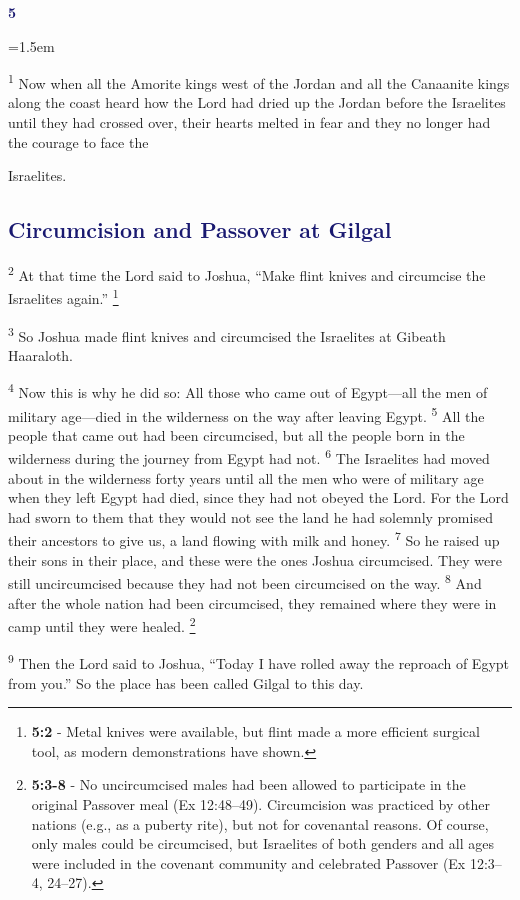 \documentclass[12pt,twoside]{article}
\newcommand{\vs}[1]{\textsuperscript{#1}}
\newcommand{\vnote}[2]{%
  \begingroup
  \renewcommand\thefootnote{}%
  \footnote{\scriptsize \textbf{}#2}%
  \addtocounter{footnote}{-1}%
  \endgroup
}
\newcommand{\chapterWithIndent}[2]{%
  \noindent
  \begin{minipage}[t]{1cm}
    \vspace{-0.4\baselineskip}
    {\textcolor{MidnightBlue}{\fontsize{40pt}{48pt}\selectfont \textbf{#1}}}
  \end{minipage}%
  \hspace{0.3cm}%
  \begin{minipage}[t]{\dimexpr\linewidth - 1.5cm - 0.3cm\relax}
    \hangindent=1.5em
    \hangafter=3
    #2
    \vspace{0.05cm}
  \end{minipage}
}
\begin{document}
\chapterWithIndent{5}{
  \vs{1} Now when all the Amorite kings west of the Jordan and all the Canaanite kings along the coast heard how the Lord had dried up the Jordan before the Israelites until they had crossed over, their hearts melted in fear and they no longer had the courage to face the
}

\noindent Israelites.

\subsection*{\textcolor{MidnightBlue}{\textbf{Circumcision and Passover at Gilgal}}}

\vs{2} At that time the Lord said to Joshua, ``Make flint knives and circumcise the Israelites again.''\vnote{5}{\textbf{5:2} - Metal knives were available, but flint made a more efficient surgical tool, as modern demonstrations have shown.}
\vs{3} So Joshua made flint knives and circumcised the Israelites at Gibeath Haaraloth.

\vs{4} Now this is why he did so: All those who came out of Egypt---all the men of military age---died in the wilderness on the way after leaving Egypt.
\vs{5} All the people that came out had been circumcised, but all the people born in the wilderness during the journey from Egypt had not.
\vs{6} The Israelites had moved about in the wilderness forty years until all the men who were of military age when they left Egypt had died, since they had not obeyed the Lord. For the Lord had sworn to them that they would not see the land he had solemnly promised their ancestors to give us, a land flowing with milk and honey.
\vs{7} So he raised up their sons in their place, and these were the ones Joshua circumcised. They were still uncircumcised because they had not been circumcised on the way.
\vs{8} And after the whole nation had been circumcised, they remained where they were in camp until they were healed.\vnote{8}{\textbf{5:3-8} - No uncircumcised males had been allowed to participate in the original Passover meal (Ex 12:48–49). Circumcision was practiced by other nations (e.g., as a puberty rite), but not for covenantal reasons. Of course, only males could be circumcised, but Israelites of both genders and all ages were included in the covenant community and celebrated Passover (Ex 12:3–4, 24–27).}

\vs{9} Then the Lord said to Joshua, ``Today I have rolled away the reproach of Egypt from you.'' So the place has been called Gilgal to this day.
\end{document}
